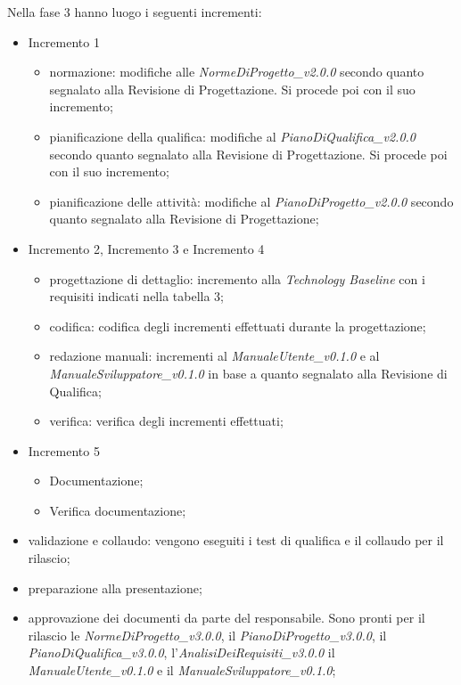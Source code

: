 Nella fase 3 hanno luogo i seguenti incrementi:
\begin{itemize}
	\item Incremento 1
	\begin{itemize}
		\item normazione: modifiche alle \textit{NormeDiProgetto\_v2.0.0} secondo quanto segnalato alla Revisione di Progettazione. Si procede poi con il suo incremento;
		\item pianificazione della qualifica: modifiche al \textit{PianoDiQualifica\_v2.0.0} secondo quanto segnalato alla Revisione di Progettazione. Si procede poi con il suo incremento;
		\item pianificazione delle attività: modifiche al \textit{PianoDiProgetto\_v2.0.0} secondo quanto segnalato alla Revisione di Progettazione;
	\end{itemize}
	\item Incremento 2, Incremento 3 e Incremento 4
	\begin{itemize}
		\item progettazione di dettaglio: incremento alla \textit{Technology Baseline} con i requisiti indicati nella tabella 3;
		\item codifica: codifica degli incrementi effettuati durante la progettazione;
		\item redazione manuali: incrementi al \textit{ManualeUtente\_v0.1.0} e al \textit{ManualeSviluppatore\_v0.1.0} in base a quanto segnalato alla Revisione di Qualifica;
		\item verifica: verifica degli incrementi effettuati;
	\end{itemize}
	\item Incremento 5
	\begin{itemize}
		\item Documentazione;
		\item Verifica documentazione;
	\end{itemize}
	\item validazione e collaudo: vengono eseguiti i test di qualifica e il collaudo per il rilascio;
	\item preparazione alla presentazione;
	\item approvazione dei documenti da parte del responsabile. Sono pronti per il rilascio le \textit{NormeDiProgetto\_v3.0.0}, il \textit{PianoDiProgetto\_v3.0.0}, il \textit{PianoDiQualifica\_v3.0.0}, l'\textit{AnalisiDeiRequisiti\_v3.0.0} il
	\textit{ManualeUtente\_v0.1.0} e il \textit{ManualeSviluppatore\_v0.1.0};
\end{itemize}

